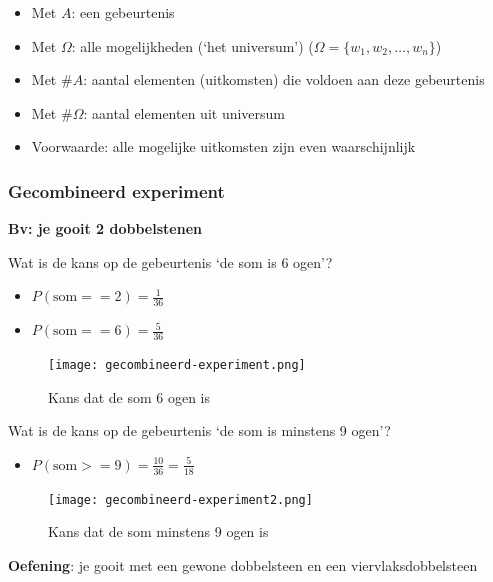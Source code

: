 \documentclass{article}
\begin{document}
\begin{itemize}
    \item Met $A$: een gebeurtenis
    \item Met $\Omega$: alle mogelijkheden (`het universum') ($\Omega = \{w_1, w_2, \dots, w_n\}$)
    \item Met $\#A$: aantal elementen (uitkomsten) die voldoen aan deze gebeurtenis
    \item Met $\#\Omega$: aantal elementen uit universum
    \item Voorwaarde: alle mogelijke uitkomsten zijn even waarschijnlijk
\end{itemize}

\subsubsection{Gecombineerd experiment}

\textbf{Bv: je gooit 2 dobbelstenen}

Wat is de kans op de gebeurtenis `de som is 6 ogen'?

\begin{itemize}
    \item $P(\text{som} == 2) = \frac{1}{36}$
    \item $P(\text{som} == 6) = \frac{5}{36}$
\end{itemize}

\begin{figure}[H]
    \centering
    \texttt{[image: gecombineerd-experiment.png]}
    \caption{Kans dat de som 6 ogen is}
\end{figure}

Wat is de kans op de gebeurtenis `de som is minstens 9 ogen'?

\begin{itemize}
    \item $P(\text{som} >= 9) = \frac{10}{36} = \frac{5}{18}$
\end{itemize}

\begin{figure}[H]
    \centering
    \texttt{[image: gecombineerd-experiment2.png]}
    \caption{Kans dat de som minstens 9 ogen is}
\end{figure}

\textbf{Oefening}: je gooit met een gewone dobbelsteen en een viervlaksdobbelsteen
\end{document}

